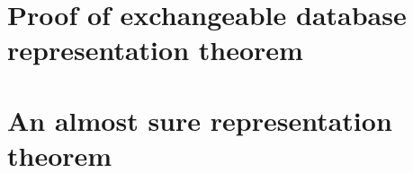 %
%
%
%
%

\section{Proof of exchangeable database representation theorem}
\label{sec:proof_database}

\section{An almost sure representation theorem}
\label{sec:almost_sure}

